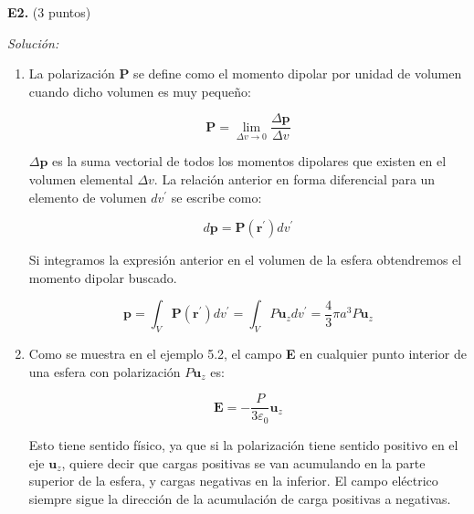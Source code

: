 \textbf{E2.} (3 puntos)


\vspace{20px}
\textit{Solución:}
\\

\begin{enumerate}
[label=\alph*)]
    \item La polarización \textbf{P} se define como el momento dipolar por unidad de volumen cuando dicho volumen es muy pequeño:

    \begin{equation*}
        \mathbf{P} = \lim_{\Delta v \rightarrow 0} \frac{\Delta \mathbf{p}}{\Delta v}
    \end{equation*}

    $\Delta \mathbf{p}$ es la suma vectorial de todos los momentos dipolares que existen en el volumen elemental $\Delta v$.
    La relación anterior en forma diferencial para un elemento de volumen $dv^\prime$ se escribe como:

    \begin{equation*}
        d\mathbf{p} = \mathbf{P}(\mathbf{r}^\prime) dv^\prime
    \end{equation*}

    Si integramos la expresión anterior en el volumen de la esfera obtendremos el momento dipolar buscado.

    \begin{equation*}
        \mathbf{p} = \int_{V} \mathbf{P}(\mathbf{r}^\prime) dv^\prime
        = \int_{V} P \mathbf{u}_z dv^\prime = \frac{4}{3} \pi a^3 P \mathbf{u}_z
    \end{equation*}

    \vspace{20px}
    \item Como se muestra en el ejemplo 5.2, el campo \textbf{E} en cualquier punto interior de una esfera con polarización
    $P \mathbf{u}_z $ es:

    \begin{equation*}
        \mathbf{E} = - \frac{P}{3 \varepsilon_0} \mathbf{u}_z
    \end{equation*}

    Esto tiene sentido físico, ya que si la polarización tiene sentido positivo en el eje $\mathbf{u}_z$, quiere decir
    que cargas positivas se van acumulando en la parte superior de la esfera, y cargas negativas en la inferior.
    El campo eléctrico siempre sigue la dirección de la acumulación de carga positivas a negativas.


\end{enumerate}
